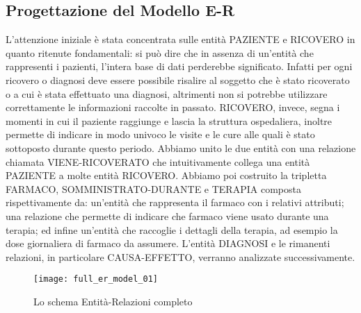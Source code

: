 \documentclass{article}
\begin{document}
\clearpage
\subsection{Progettazione del Modello E-R}

L'attenzione iniziale è stata concentrata sulle entità PAZIENTE e RICOVERO in quanto ritenute fondamentali: si può dire che in assenza di un'entità che rappresenti i pazienti, l'intera base di dati perderebbe significato.
Infatti per ogni ricovero o diagnosi deve essere possibile risalire al soggetto che è stato ricoverato o a cui è stata effettuato una diagnosi, altrimenti non si potrebbe utilizzare correttamente le informazioni raccolte in passato.
RICOVERO, invece, segna i momenti in cui il paziente raggiunge e lascia la struttura ospedaliera, inoltre permette di indicare in modo univoco le visite e le cure alle quali è stato sottoposto durante questo periodo.
Abbiamo unito le due entità con una relazione chiamata VIENE-RICOVERATO che intuitivamente collega una entità PAZIENTE a molte entità RICOVERO.
Abbiamo poi costruito la tripletta FARMACO, SOMMINISTRATO-DURANTE e TERAPIA composta rispettivamente da: un'entità che rappresenta il farmaco con i relativi attributi; una relazione che permette di indicare che farmaco viene usato durante una terapia; ed infine un'entità che raccoglie i dettagli della terapia, ad esempio la dose giornaliera di farmaco da assumere.
L'entità DIAGNOSI e le rimanenti relazioni, in particolare CAUSA-EFFETTO, verranno analizzate successivamente.


\begin{figure} %
  \centering
  \texttt{[image: full\_er\_model\_01]}
  \caption{Lo schema Entità-Relazioni completo}
  \label{figure_ER_01}
\end{figure}
\end{document}
